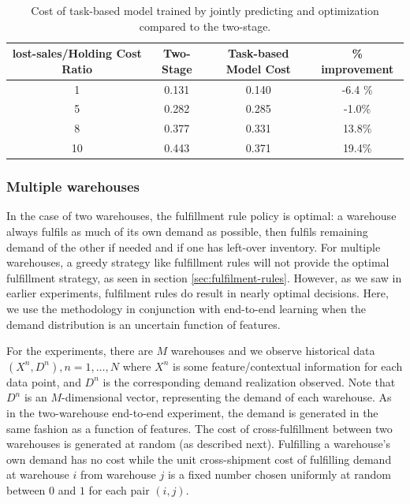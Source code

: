 \documentclass[poms,final,blindrev]{poms1_V1} %
\begin{document}
\begin{table}
    \centering
    \renewcommand{\arraystretch}{0.5}
    \begin{tabular}{c c c c} \toprule
        lost-sales/Holding Cost Ratio & Two-Stage & Task-based Model Cost & \% improvement \\ \midrule
        1 & 0.131 & 0.140 & -6.4 \% \\ 
        5 & 0.282 & 0.285 &  -1.0\% \\
        8 & 0.377 & 0.331 &  13.8\% \\
        10 & 0.443 & 0.371 & 19.4\% \\ 
        \bottomrule
    \end{tabular}
    \caption{Cost of task-based model trained by jointly predicting and optimization compared to the two-stage.}
    \label{tab:optimal-comparison}
\end{table}


\subsubsection*{Multiple warehouses}

In the case of two warehouses, the fulfillment rule policy is optimal: a warehouse always fulfils as much of its own demand as possible, then fulfils remaining demand of the other if needed and if one has left-over inventory. For multiple warehouses, a greedy strategy like fulfillment rules will not provide the optimal fulfillment strategy, as seen in section  \ref{sec:fulfilment-rules}. However, as we saw in earlier experiments, fulfilment rules do result in nearly optimal decisions. Here, we use the methodology in conjunction with end-to-end learning when the demand distribution is an uncertain function of features. 

For the experiments, there are $M$ warehouses and we observe historical data $(X^n, D^n), n = 1, \dots, N$ where $X^n$ is some feature/contextual information for each data point, and $D^n$ is the corresponding demand realization observed. Note that $D^n$ is an $M$-dimensional vector, representing the demand of each warehouse. As in the two-warehouse end-to-end experiment, the demand is generated in the same fashion as a function of features. The cost of cross-fulfillment between two warehouses is generated at random (as described next). Fulfilling a warehouse's own demand has no 
cost while the unit cross-shipment cost of fulfilling demand at warehouse $i$ from warehouse $j$ is a fixed number chosen uniformly at random between $0$ and $1$ for each pair $(i,j)$. 
\end{document}
